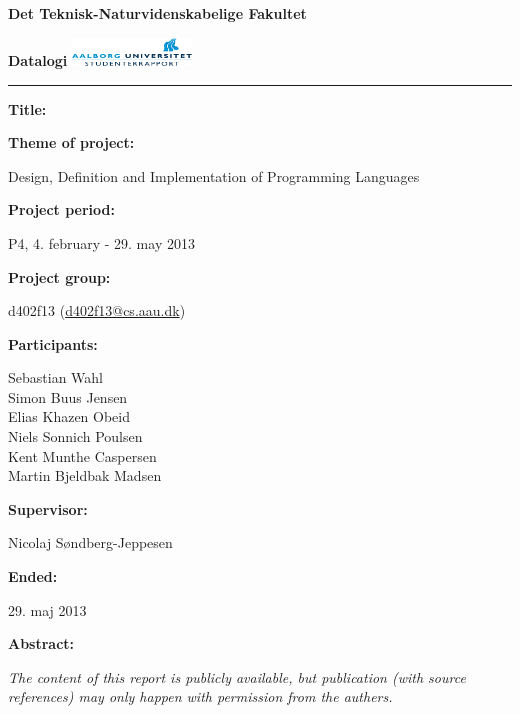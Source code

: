 \begin{nopagebreak}
\LARGE{\textbf{Det Teknisk-Naturvidenskabelige Fakultet}}\vspace{-0.9cm}

\large{\textbf{Datalogi}}
\hspace{10.5cm}\includegraphics[height=0.75cm]{pictures/aau_logo.pdf}


\hrule

\newcommand{\titleitem}[2]{\textbf{#1:}

\hspace*{0.5cm}
\begin{minipage}{0.9\columnwidth}#2\end{minipage}
\vspace{0.25cm}}
\begin{multicols}{2}

\titleitem{Title}{}

\titleitem{Theme of project}{Design, Definition and Implementation of Programming Languages}

\titleitem{Project period}{P4, 4. february - 29. may 2013}

\titleitem{Project group}{d402f13 (\url{d402f13@cs.aau.dk})}

\titleitem{Participants}{
    Sebastian Wahl\\
    Simon Buus Jensen\\
    Elias Khazen Obeid\\
    Niels Sonnich Poulsen\\
    Kent Munthe Caspersen\\
    Martin Bjeldbak Madsen
}

\titleitem{Supervisor}{Nicolaj Søndberg-Jeppesen}

\titleitem{Ended}{29. maj 2013}

\vfill
\columnbreak

\titleitem{Abstract}{}

\end{multicols}
\centering
\textit{The content of this report is publicly available, but publication (with source references) may only happen with permission from the authers.}

\end{nopagebreak}
